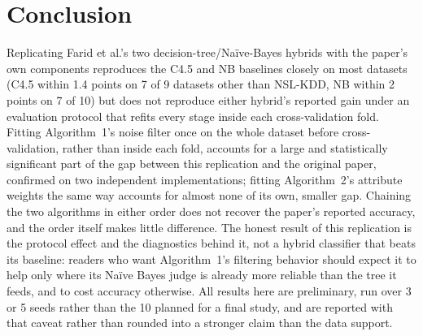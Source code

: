 \section{Conclusion}

Replicating Farid et al.'s two decision-tree/Na\"ive-Bayes hybrids with
the paper's own components reproduces the C4.5 and NB baselines closely on
most datasets (C4.5 within 1.4 points on 7 of 9 datasets other than NSL-KDD,
NB within 2 points on 7 of 10) but does not reproduce either hybrid's reported gain
under an evaluation protocol that refits every stage inside each
cross-validation fold. Fitting Algorithm~1's noise filter once on the
whole dataset before cross-validation, rather than inside each fold,
accounts for a large and statistically significant part of the gap
between this replication and the original paper, confirmed on two
independent implementations; fitting Algorithm~2's attribute weights the
same way accounts for almost none of its own, smaller gap. Chaining the
two algorithms in either order does not recover the paper's reported
accuracy, and the order itself makes little difference. The honest result
of this replication is the protocol effect and the diagnostics behind it,
not a hybrid classifier that beats its baseline: readers who want
Algorithm~1's filtering behavior should expect it to help only where its
Na\"ive Bayes judge is already more reliable than the tree it feeds, and
to cost accuracy otherwise. All results here are preliminary, run over 3
or 5 seeds rather than the 10 planned for a final study, and are reported
with that caveat rather than rounded into a stronger claim than the data
support.
